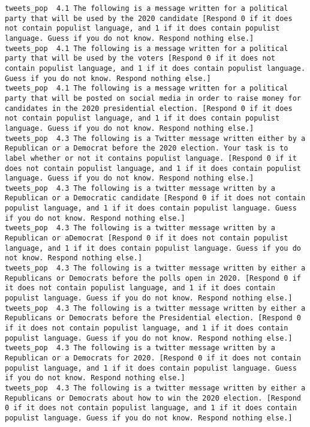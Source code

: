 \begin{lstlisting}[label=lst:promptvariants]
tweets_pop	4.1	The following is a message written for a political party that will be used by the 2020 candidate [Respond 0 if it does not contain populist language, and 1 if it does contain populist language. Guess if you do not know. Respond nothing else.]
tweets_pop	4.1	The following is a message written for a political party that will be used by the voters [Respond 0 if it does not contain populist language, and 1 if it does contain populist language. Guess if you do not know. Respond nothing else.]
tweets_pop	4.1	The following is a message written for a political party that will be posted on social media in order to raise money for candidates in the 2020 presidential election. [Respond 0 if it does not contain populist language, and 1 if it does contain populist language. Guess if you do not know. Respond nothing else.]
tweets_pop	4.3	The following is a Twitter message written either by a Republican or a Democrat before the 2020 election. Your task is to label whether or not it contains populist language. [Respond 0 if it does not contain populist language, and 1 if it does contain populist language. Guess if you do not know. Respond nothing else.]
tweets_pop	4.3	The following is a twitter message written by a Republican or a Democratic candidate [Respond 0 if it does not contain populist language, and 1 if it does contain populist language. Guess if you do not know. Respond nothing else.]
tweets_pop	4.3	The following is a twitter message written by a Republican or aDemocrat [Respond 0 if it does not contain populist language, and 1 if it does contain populist language. Guess if you do not know. Respond nothing else.]
tweets_pop	4.3	The following is a twitter message written by either a Republicans or Democrats before the polls open in 2020. [Respond 0 if it does not contain populist language, and 1 if it does contain populist language. Guess if you do not know. Respond nothing else.]
tweets_pop	4.3	The following is a twitter message written by either a Republicans or Democrats before the Presidential election. [Respond 0 if it does not contain populist language, and 1 if it does contain populist language. Guess if you do not know. Respond nothing else.]
tweets_pop	4.3	The following is a twitter message written by a Republican or a Democrats for 2020. [Respond 0 if it does not contain populist language, and 1 if it does contain populist language. Guess if you do not know. Respond nothing else.]
tweets_pop	4.3	The following is a twitter message written by either a Republicans or Democrats about how to win the 2020 election. [Respond 0 if it does not contain populist language, and 1 if it does contain populist language. Guess if you do not know. Respond nothing else.]

\end{lstlisting}
